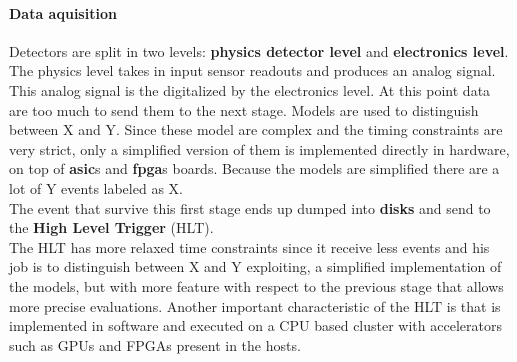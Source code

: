 \paragraph{Data aquisition}
Detectors are split in two levels: \textbf{physics detector level} and \textbf{electronics level}. The physics level takes in input sensor readouts and produces an analog signal. This analog signal is the digitalized by the electronics level. At this point data are too much to send them to the next stage. Models are used to distinguish between X and Y. Since these model are complex and the timing constraints are very strict, only a simplified version of them is implemented directly in hardware, on top of \textbf{asic}s and \textbf{fpga}s boards. Because the models are simplified there are a lot of Y events labeled as X. \\
The event that survive this first stage ends up dumped into \textbf{disks} and send to the \textbf{High Level Trigger} (HLT).\\
The HLT has more relaxed time constraints since it receive less events and his job is to distinguish between X and Y exploiting, a simplified implementation of the models, but with more feature with respect to the previous stage that allows more precise evaluations. Another important characteristic of the HLT is that is implemented in software and executed on a CPU based cluster with accelerators such as GPUs and FPGAs present in the hosts.
